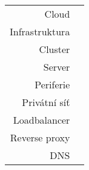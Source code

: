 \begin{tabular}{rl}
Cloud\\
Infrastruktura\\
Cluster\\
Server\\
Periferie\\
Privátní síť\\
Loadbalancer\\
Reverse proxy\\
DNS\\
\end{tabular}